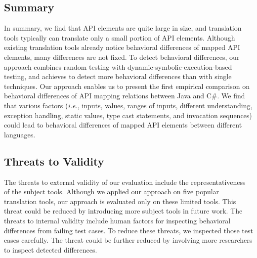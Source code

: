 \subsection{Summary}
\label{sec:evaluation:summary}
In summary, we find that API elements are quite large in size, and translation tools typically can translate only a small portion of API elements. Although existing translation tools already notice behavioral differences of mapped API elements, many differences are not fixed. To detect behavioral differences, our approach combines random testing with dynamic-symbolic-execution-based testing, and achieves to detect more behavioral differences than with single techniques. Our approach enables us to present the first empirical comparison on behavioral differences of API mapping relations between Java and C\#. We find that various factors (\emph{i.e.},  inputs,  values, ranges of inputs, different understanding, exception handling, static values, type cast statements, and invocation sequences) could lead to behavioral differences of mapped API elements between different languages.

\subsection{Threats to Validity}
\label{sec:evaluation:threat}
The threats to external validity of our evaluation include the representativeness of the subject tools. Although we applied
our approach on five popular translation tools, our approach is evaluated only on these limited tools. This threat could be reduced by introducing more subject tools in future work. The threats to internal validity include human factors for inspecting behavioral differences from failing test cases. To reduce these threats, we inspected those test cases carefully. The threat could be further reduced by involving more researchers to inspect detected differences.
